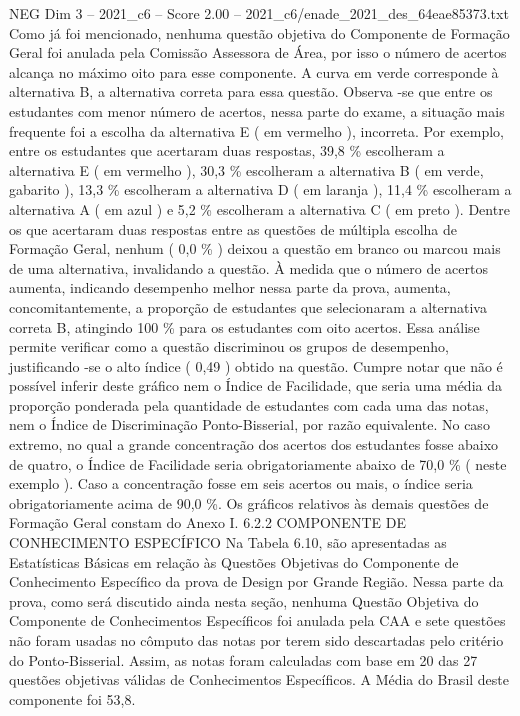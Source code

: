 \begin{textsample}{NEG Dim 3 – 2021\_c6 – Score 2.00 – 2021\_c6/enade\_2021\_des\_64eae85373.txt}
Como já foi mencionado, nenhuma questão objetiva do Componente de Formação Geral foi anulada pela Comissão Assessora de Área, por isso o número de acertos alcança no máximo oito para esse componente.
A curva em verde corresponde à alternativa B, a alternativa correta para essa questão.
Observa -se que entre os estudantes com menor número de acertos, nessa parte do exame, a situação mais frequente foi a escolha da alternativa E ( em vermelho ), incorreta.
Por exemplo, entre os estudantes que acertaram duas respostas, 39,8 \% escolheram a alternativa E ( em vermelho ), 30,3 \% escolheram a alternativa B ( em verde, gabarito ), 13,3 \% escolheram a alternativa D ( em laranja ), 11,4 \% escolheram a alternativa A ( em azul ) e 5,2 \% escolheram a alternativa C ( em preto ).
Dentre os que acertaram duas respostas entre as questões de múltipla escolha de Formação Geral, nenhum ( 0,0 \% ) deixou a questão em branco ou marcou mais de uma alternativa, invalidando a questão.
À medida que o número de acertos aumenta, indicando desempenho melhor nessa parte da prova, aumenta, concomitantemente, a proporção de estudantes que selecionaram a alternativa correta B, atingindo 100 \% para os estudantes com oito acertos.
Essa análise permite verificar como a questão discriminou os grupos de desempenho, justificando -se o alto índice ( 0,49 ) obtido na questão.
Cumpre notar que não é possível inferir deste gráfico nem o Índice de Facilidade, que seria uma média da proporção ponderada pela quantidade de estudantes com cada uma das notas, nem o Índice de Discriminação Ponto-Bisserial, por razão equivalente.
No caso extremo, no qual a grande concentração dos acertos dos estudantes fosse abaixo de quatro, o Índice de Facilidade seria obrigatoriamente abaixo de 70,0 \% ( neste exemplo ).
Caso a concentração fosse em seis acertos ou mais, o índice seria obrigatoriamente acima de 90,0 \%.
Os gráficos relativos às demais questões de Formação Geral constam do Anexo I. 6.2.2 COMPONENTE DE CONHECIMENTO ESPECÍFICO Na Tabela 6.10, são apresentadas as Estatísticas Básicas em relação às Questões Objetivas do Componente de Conhecimento Específico da prova de Design por Grande Região.
Nessa parte da prova, como será discutido ainda nesta seção, nenhuma Questão Objetiva do Componente de Conhecimentos Específicos foi anulada pela CAA e sete questões não foram usadas no cômputo das notas por terem sido descartadas pelo critério do Ponto-Bisserial.
Assim, as notas foram calculadas com base em 20 das 27 questões objetivas válidas de Conhecimentos Específicos.
A Média do Brasil deste componente foi 53,8.

\end{textsample}
